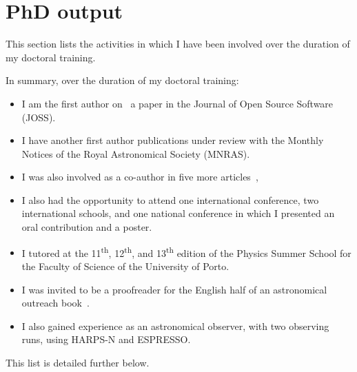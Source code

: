 \chapter{PhD output}\label{appendix:phd_output}

This section lists the activities in which I have been involved over the duration of my doctoral training.

In summary, over the duration of my doctoral training:
\begin{itemize}
    \item I am the first author on~\citep{neal_eniric_2019} a paper in the Journal of Open Source Software (JOSS).
    \item I have another first author publications under review with the Monthly Notices of the Royal Astronomical Society (MNRAS).
    \item I was also involved as a co-author in five more articles~\citep{figueira_radial_2016, barros_precise_2017, santerne_earthsized_2018, lillo-box_troy_2018, ulmer-moll_telluric_2018},
    \item I also had the opportunity to attend one international conference, two international schools, and one national conference in which I presented an oral contribution and a poster.
    \item I tutored at the 11\textsuperscript{th}, 12\textsuperscript{th}, and 13\textsuperscript{th} edition of the Physics Summer School for the Faculty of Science of the University of Porto.
    \item I was invited to be a proofreader for the English half of an astronomical outreach book~\citet{figueira_astro_2015}.
    \item I also gained experience as an astronomical observer, with two observing runs, using {HARPS-N} and {ESPRESSO}.
\end{itemize}

This list is detailed further below.

\clearpage


\clearpage


\clearpage


\clearpage


\clearpage


\clearpage


\clearpage
